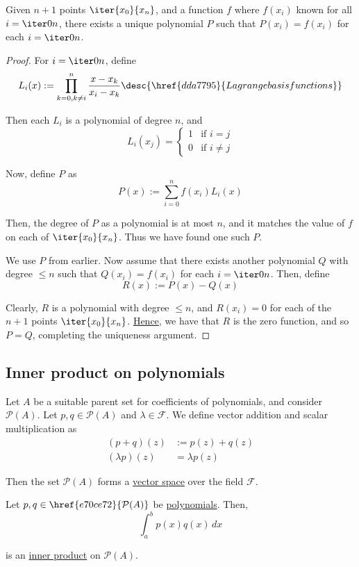 \label{d7dc069}

Given $n+1$ points $\iter{x_0}{x_n}$, and a function $f$ where $f(x_i)$ known
for all $i=\iter0n$, there exists a unique polynomial $P$ such that
$P(x_i)=f(x_i)$ for each $i=\iter0n$.

\begin{proof}
   For $i=\iter0n$, define
  $$
    L_i(x):=\prod_{k=0,k\neq i}^n\frac{x-x_k}{x_i-x_k}\desc{\href{dda7795}{Lagrange basis functions}}
  $$

  Then each $L_i$ is a polynomial of degree $n$, and
  $$
    L_i(x_j)=\begin{cases}
      1 & \text{if }i=j     \\
      0 & \text{if }i\neq j
    \end{cases}
  $$

  Now, define $P$ as
  $$
    P(x):=\sum_{i=0}^nf(x_i)L_i(x)
  $$

  Then, the degree of $P$ as a polynomial is at most $n$, and it matches the
  value of $f$ on each of $\iter{x_0}{x_n}$. Thus we have found one such $P$.

   We use $P$ from earlier. Now assume that there exists
  another polynomial $Q$ with degree $\leq n$ such that $Q(x_i)=f(x_i)$ for each
  $i=\iter0n$. Then, define
  $$
    R(x):=P(x)-Q(x)
  $$

  Clearly, $R$ is a polynomial with degree $\leq n$, and $R(x_i)=0$ for each of
  the $n+1$ points $\iter{x_0}{x_n}$. \href{ea3fbed}{Hence}, we have that $R$
  is the zero function, and so $P=Q$, completing the uniqueness argument.
\end{proof}

\nextsection
\subsection{Inner product on polynomials}\label{c5c59eb}

\label{b9904c1}

Let $A$ be a suitable parent set for coefficients of polynomials, and consider
\href{e70ce72}{$\mathcal P(A)$}. Let $p,q\in\mathcal P(A)$ and
$\lambda\in\mathcal F$. We define vector addition and scalar multiplication as
\begin{align*}
  (p+q)(z)       &:=p(z)+q(z)   \\
  (\lambda p)(z) &=\lambda p(z)
\end{align*}

Then the set $\mathcal P(A)$ forms a \href{fc83050}{vector space} over the
field $\mathcal F$.


\label{a7aabef}

Let $p,q\in\href{e70ce72}{\mathcal P(A)}$ be \href{bdde0f1}{polynomials}. Then,
$$
  \int_a^bp(x)q(x)\,dx
$$

is an \href{cebd07a}{inner product} on $\mathcal P(A)$.
